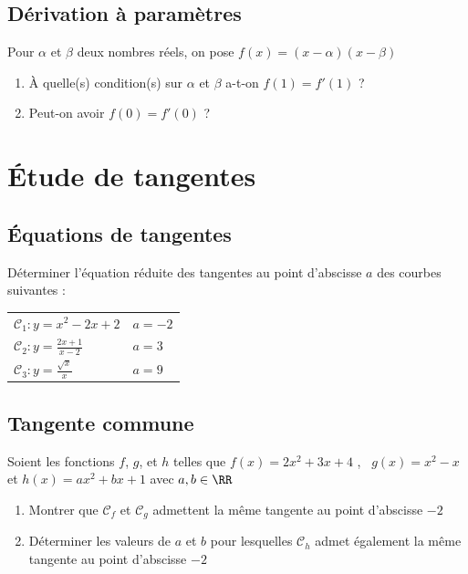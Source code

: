 \documentclass[oneside,12pt]{book}          %
\begin{document}
\subsection{Dérivation à paramètres}
Pour $\alpha$ et $\beta$ deux nombres réels, on pose $f(x)=(x-\alpha)(x-\beta)$
\begin{enumerate}
    \item À quelle(s) condition(s) sur $\alpha$ et $\beta$ a-t-on $f(1)=f'(1)$ ?
    \item Peut-on avoir $f(0)=f'(0)$ ?
\end{enumerate}



\section{Étude de tangentes}

\subsection{Équations de tangentes}
 Déterminer l'équation réduite des tangentes au point d'abscisse $a$ des courbes suivantes : 

\renewcommand{\arraystretch}{1.4}
\begin{tabular}{p{} p{}}

    $\mathscr{C}_1:y=x^{2}-2x+2$ & $a=-2$ \\
    $\mathscr{C}_2:y=\frac{2x+1}{x-2}$ & $a=3$ \\
    $\mathscr{C}_3:y=\frac{\sqrt{x}}{x}$ & $a=9$
\end{tabular}



\subsection{Tangente commune}
 Soient les fonctions $f$, $g$, et $h$ telles que $f(x)=2x^{2}+3x+4$ ,~ $g(x)= x^{2}-x$ et $h(x)= ax^{2}+bx+1$ avec $a,b\in\RR$

\begin{enumerate}
    \item Montrer que $\mathscr{C}_{f}$ et $\mathscr{C}_{g}$ admettent la même tangente au point d'abscisse $-2$
    \item Déterminer les valeurs de $a$ et $b$ pour lesquelles $\mathscr{C}_{h}$ admet également la même tangente au point d'abscisse $-2$
\end{enumerate}
\end{document}
